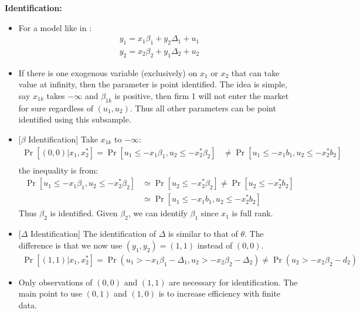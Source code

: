 \documentclass{book}
\theoremstyle{plain}
\theoremstyle{definition}
\newcommand{\mytitle}[1]{{\large{\textbf{#1}}}}
\begin{document}
\mytitle{Identification:}
\begin{itemize}
	\item For a model like in \cite{Bresnahan:1990gw}:
		\[\begin{array} { l } { y _ { 1 }= x _ { 1 } \beta _ { 1 } + y _ { 2 } \Delta _ { 1 } + u _ { 1 } } \\ { y _ { 2 } = x _ { 2 } \beta _ { 2 } + y _ { 1 } \Delta _ { 2 } + u _ { 2 } } \end{array}\]

	\item If there is one exogenous variable (exclusively) on $x_1$ or $x_2$ that can take value at infinity, then the parameter is point identified. The idea is simple, say $x_{1k}$ takes $-\infty$ and $\beta_{1k}$ is positive, then firm 1 will not enter the market for sure regardless of $(u_1,u_2)$. Thus all other parameters can be point identified using this subsample.

	\item {[$\beta$ Identification]} Take $x_{1k}$ to $-\infty$:
	\begin{align}
	\operatorname { Pr } [ ( 0,0 ) | x _ { 1 } , x _ { 2 } ^ { * } ] = \operatorname { Pr } \left[ u _ { 1 } \leq - x _ { 1 } \beta _ { 1 } , u _ { 2 } \leq - x _ { 2 } ^ { * } \beta _ { 2 } \right] & \neq \operatorname { Pr } \left[ u _ { 1 } \leq - x _ { 1 } b _ { 1 } , u _ { 2 } \leq - x _ { 2 } ^ { * } b _ { 2 } \right] \\
	& 
	\end{align}
	the inequality is from:
	\[\begin{aligned} \operatorname { Pr } \left[ u _ { 1 } \leq - x _ { 1 } \beta _ { 1 } , u _ { 2 } \leq - x _ { 2 } ^ { * } \beta _ { 2 } \right] & \simeq \operatorname { Pr } \left[ u _ { 2 } \leq - x _ { 2 } ^ { * } \beta _ { 2 } \right] \neq \operatorname { Pr } \left[ u _ { 2 } \leq - x _ { 2 } ^ { * } b _ { 2 } \right] \\ & \simeq \operatorname { Pr } \left[ u _ { 1 } \leq - x _ { 1 } b _ { 1 } , u _ { 2 } \leq - x _ { 2 } ^ { * } b _ { 2 } \right] \end{aligned}\]
	Thus $\beta_2$ is identified. Given $\beta_2$, we can identify $\beta_1$ since $x_1$ is full rank.

	\item {[$\Delta$ Identification]} The identification of $\Delta$ is similar to that of $\theta$. The difference is that we now use $(y_1,y_2) = (1,1)$ instead of $(0,0)$.
	\begin{align}
		\Pr[(1,1) | x_1, x_2^*] = \Pr(u_1 > -x_1\beta_1 - \Delta_1, 
		u_2 > - x_2\beta_2 - \Delta_2) \neq \Pr(u_2 > -x_2\beta_2 -d_2)
	\end{align}

	\item Only observations of $(0,0)$ and $(1,1)$ are necessary for identification. The main point to use $(0,1)$ and $(1,0)$ is to increase efficiency with finite data.
\end{itemize}
\end{document}
